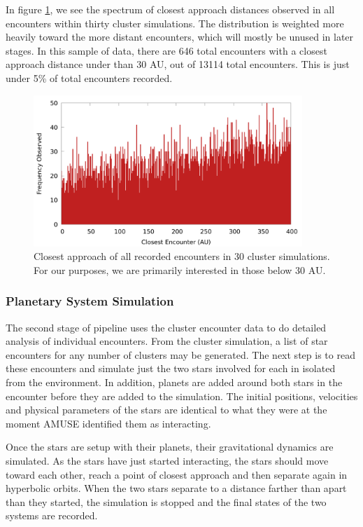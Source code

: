 \documentclass[12pt]{article}
\begin{document}
    In figure \ref{fig:encounter_distance}, we see the spectrum of closest approach
    distances observed in all encounters within thirty cluster simulations. The
    distribution is weighted more heavily toward the more distant encounters, which
    will mostly be unused in later stages. In this sample of data, there are
    646 total encounters with a closest approach distance under than 30 AU, 
    out of 13114 total
    encounters. This is just under 5\% of total encounters recorded.


    \begin{figure}[H]
        \centering
        \caption{Closest approach of all recorded encounters in 30 cluster simulations.
            For our purposes, we are primarily interested in those below 30 AU.
        }
        \label{fig:encounter_distance}
        \includegraphics[width=4.0in]{encounter_distance_frequency}
    \end{figure}

    \subsubsection{Planetary System Simulation}

    The second stage of pipeline uses the cluster encounter data to do
    detailed analysis of individual encounters.
    From the cluster simulation, a list of star encounters for any number of 
    clusters may be generated. The next step is to read these encounters and
    simulate just the two stars involved for each in isolated from the 
    environment. In addition, planets are added around both stars in the
    encounter before they are added to the simulation. The initial positions,
    velocities and physical parameters of the stars are identical to what they
    were at the moment AMUSE identified them as interacting. 

    Once the stars are setup with their planets, their gravitational dynamics
    are simulated. As the stars have just started interacting, the stars should
    move toward each other, reach a point of closest approach and then separate again
    in hyperbolic orbits. When the two stars separate to a distance farther than
    apart than they started, the simulation is stopped and the final states of the two
    systems are recorded. 
\end{document}
